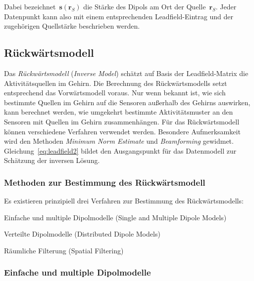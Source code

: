\documentclass[doc,a4paper,12pt]{apa6}
\newcommand{\mx}[1]{\mathbf{#1}}
\begin{document}
Dabei bezeichnet~$\mx{s}(\mx{r}_S)$ die Stärke des Dipols am Ort der Quelle~$\mx{r}_S$. Jeder Datenpunkt kann also mit einem entsprechenden Leadfield-Eintrag und der zugehörigen Quellstärke beschrieben werden.



\subsection{Rückwärtsmodell}

Das \emph{Rückwärtsmodell} (\emph{Inverse Model}) schätzt auf Basis der Leadfield-Matrix die Aktivitätsquellen im Gehirn. Die Berechnung des Rückwärtsmodells setzt entsprechend das Vorwärtsmodell voraus. Nur wenn bekannt ist, wie sich bestimmte Quellen im Gehirn auf die Sensoren außerhalb des Gehirns auswirken, kann berechnet werden, wie umgekehrt bestimmte Aktivitätsmuster an den Sensoren mit Quellen im Gehirn zusammenhängen. Für das Rückwärtsmodell können verschiedene Verfahren verwendet werden. Besondere Aufmerksamkeit wird den Methoden \emph{Minimum Norm Estimate} und \emph{Beamforming} gewidmet. Gleichung~\ref{eq:leadfield2} bildet den Ausgangspunkt für das Datenmodell zur Schätzung der inversen Lösung.

\subsubsection{Methoden zur Bestimmung des Rückwärtsmodell}

Es existieren prinzipiell drei Verfahren zur Bestimmung des Rückwärtsmodells:

\begin{compactitem}
\item Einfache und multiple Dipolmodelle (Single and Multiple Dipole Models)
\item Verteilte Dipolmodelle (Distributed Dipole Models)
\item Räumliche Filterung (Spatial Filtering)
\end{compactitem}

\subsubsection{Einfache und multiple Dipolmodelle}
\end{document}
